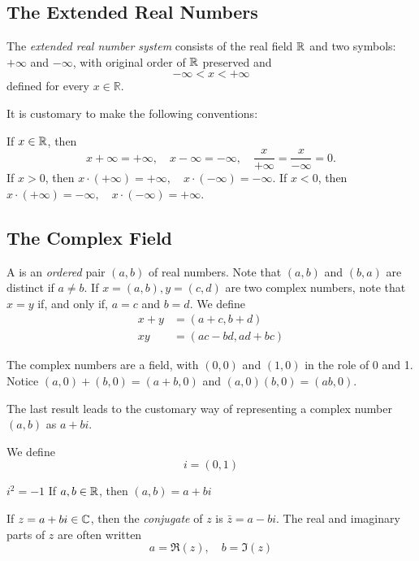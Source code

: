 \documentclass{article}
\begin{document}
\subsection{The Extended Real Numbers}
\begin{definition}
    The \emph{extended real number system} consists of the real field $\mathbb R$ and two symbols: $+\infty$ and $-\infty$, with original order of $\mathbb R$ preserved and \[-\infty<x<+\infty\]defined for every $x\in\mathbb{R}$.
\end{definition}
It is customary to make the following conventions:
\begin{enumerate}
    \ii If $x\in\mathbb R$, then \[x+\infty=+\infty,\quad x-\infty=-\infty,\quad \frac{x}{+\infty}=\frac{x}{-\infty}=0.\]
    \ii If $x>0$, then $x\cdot(+\infty)=+\infty,\quad x\cdot (-\infty)=-\infty$.
    \ii If $x<0$, then $x\cdot(+\infty)=-\infty,\quad x\cdot (-\infty)=+\infty.$
\end{enumerate}
\subsection{The Complex Field}
\begin{definition}
    A  is an \emph{ordered} pair $(a,b)$ of real numbers. Note that $(a,b)$ and $(b,a)$ are distinct if $a\neq b$. If $x=(a,b), y=(c,d)$ are two complex numbers, note that $x=y$ if, and only if, $a=c$ and $b=d$. We define \begin{align*}
        x+y&=(a+c,b+d) \\
        xy & = (ac-bd, ad+bc)
    \end{align*}   
\end{definition}
\begin{theorem}

    The complex numbers are a field, with $(0,0)$ and $(1,0)$ in the role of 0 and 1. Notice $(a,0)+(b,0)=(a+b,0)$ and $(a,0)(b,0)=(ab,0)$.
\end{theorem}
The last result leads to the customary way of representing a complex number $(a,b)$ as $a+bi$.
\begin{definition}
    We define \[i=(0,1)\]
\end{definition}
\begin{theorem}
    \listhack 
    \begin{enumerate}
        \ii $i^{2}=-1$
        \ii If $a,b\in\mathbb R$, then $(a,b)=a+bi$
    \end{enumerate}
\end{theorem}
\begin{definition}
    If $z=a+bi\in\mathbb C$, then the \emph{conjugate} of $z$ is $\bar{z}=a-bi$. The real and imaginary parts of $z$ are often written \[a=\Re(z),\quad b=\Im(z)\]
\end{definition}
\end{document}
